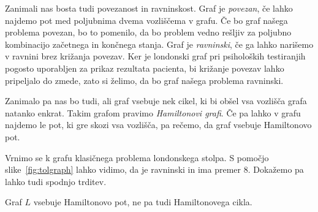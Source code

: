 \documentclass[twoside,11pt]{article}
\begin{document}
Zanimali nas bosta tudi povezanost in ravninskost.
Graf je \emph{povezan}, če lahko najdemo pot med poljubnima dvema vozliščema v grafu. Če bo graf našega problema povezan, bo to pomenilo, da bo problem vedno rešljiv za poljubno kombinacijo začetnega in končnega stanja. 
Graf je \emph{ravninski}, če ga lahko narišemo v ravnini brez križanja povezav. Ker je londonski graf pri psiholoških testiranjih pogosto uporabljen za prikaz rezultata pacienta, bi križanje povezav lahko pripeljalo do zmede, zato si želimo, da bo graf našega problema ravninski.

Zanimalo pa nas bo tudi, ali graf vsebuje nek cikel, ki bi obšel vsa vozlišča grafa natanko enkrat. Takim grafom pravimo \emph{Hamiltonovi grafi}. Če pa lahko v grafu najdemo le pot, ki gre skozi vsa vozlišča, pa rečemo, da graf vsebuje Hamiltonovo pot.


Vrnimo se k grafu klasičnega problema londonskega stolpa. S pomočjo slike~\ref{fig:tolgraph} lahko vidimo, da je ravninski in ima premer $8$. Dokažemo pa lahko tudi spodnjo trditev.

\begin{trditev}
    Graf $L$ vsebuje Hamiltonovo pot, ne pa tudi Hamiltonovega cikla.
\end{trditev}
\end{document}
